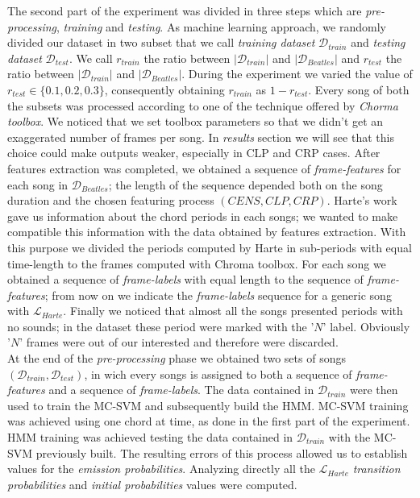 The second part of the experiment was divided in three steps which are \textit{pre-processing}, \textit{training} and \textit{testing}. As machine learning approach, we randomly divided our dataset in two subset that we call \textit{training dataset} $\mathcal{D}_{train}$ and \textit{testing dataset}  $\mathcal{D}_{test}$. We call $r_{train}$ the ratio between $|\mathcal{D}_{train}|$ and $|\mathcal{D}_{Beatles}|$ and $r_{test}$ the ratio between $|\mathcal{D}_{train}|$ and $|\mathcal{D}_{Beatles}|$. During the experiment we varied the value of $r_{test} \in \{0.1,0.2,0.3\}$, consequently obtaining $r_{train}$ as $1-r_{test}$. Every song of both the subsets was processed according to one of the technique offered by \textit{Chorma toolbox}. We noticed that we set toolbox parameters so that we didn't get an exaggerated number of frames per song. In \textit{results} section we will see that this choice could make outputs weaker, especially in CLP and CRP cases. After features extraction was completed, we obtained a sequence of \textit{frame-features} for each song in $\mathcal{D}_{Beatles}$; the length of the sequence depended both on the song duration and the chosen featuring process $(CENS,CLP,CRP)$. Harte's work gave us information about the chord periods in each songs; we wanted to make compatible this information with the data obtained by features extraction. With this purpose we divided the periods computed by Harte in sub-periods with equal time-length to the frames computed with Chroma toolbox. For each song we obtained a sequence of \textit{frame-labels} with equal length to the sequence of \textit{frame-features}; from now on we indicate the \textit{frame-labels} sequence for a generic song with $\mathcal{L}_{Harte}$. Finally we noticed that almost all the songs presented periods with no sounds; in the dataset these period were marked with the '$N$' label. Obviously '$N$' frames were out of our interested and therefore were discarded. \\
%
At the end of the \textit{pre-processing} phase we obtained two sets of songs $(\mathcal{D}_{train},\mathcal{D}_{test})$, in wich every songs is assigned to both a sequence of \textit{frame-features} and a sequence of \textit{frame-labels}. The data contained in $\mathcal{D}_{train}$ were then used to train the MC-SVM and subsequently build the HMM. MC-SVM training was achieved using one chord at time, as done in the first part of the experiment. HMM training was achieved testing the data contained in $\mathcal{D}_{train}$ with the MC-SVM previously built. The resulting errors of this process allowed us to establish values for the \textit{emission probabilities}. Analyzing directly all the $\mathcal{L}_{Harte}$ \textit{transition probabilities} and \textit{initial probabilities} values were computed. \\

